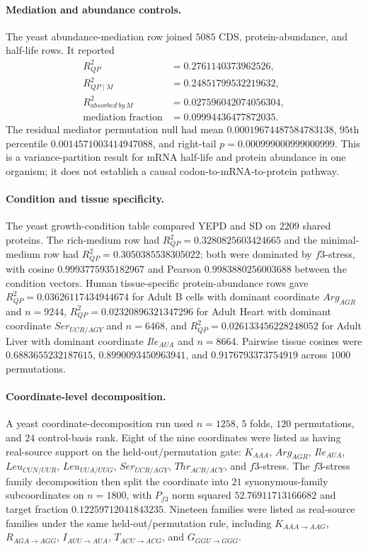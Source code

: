\paragraph{Mediation and abundance controls.}
The yeast abundance-mediation row joined $5085$ CDS, protein-abundance, and half-life rows.  It reported
$$
\begin{aligned}
R^2_{QP} &= 0.2761140373962526,\\
R^2_{QP\mid M} &= 0.24851799532219632,\\
R^2_{absorbed\ by\ M} &= 0.027596042074056304,\\
\text{mediation fraction} &= 0.09994436477872035.
\end{aligned}
$$
The residual mediator permutation null had mean $0.00019674487584783138$, $95$th percentile $0.0014571003414947088$, and right-tail $p=0.000999000999000999$.  This is a variance-partition result for mRNA half-life and protein abundance in one organism; it does not establish a causal codon-to-mRNA-to-protein pathway.

\paragraph{Condition and tissue specificity.}
The yeast growth-condition table compared YEPD and SD on $2209$ shared proteins.  The rich-medium row had $R^2_{QP}=0.3280825603424665$ and the minimal-medium row had $R^2_{QP}=0.3050385538305022$; both were dominated by $f3$-stress, with cosine $0.9993775935182967$ and Pearson $0.9983880256003688$ between the condition vectors.  Human tissue-specific protein-abundance rows gave $R^2_{QP}=0.03626117434944674$ for Adult B cells with dominant coordinate $Arg_{AGR}$ and $n=9244$, $R^2_{QP}=0.02320896321347296$ for Adult Heart with dominant coordinate $Ser_{UCR/AGY}$ and $n=6468$, and $R^2_{QP}=0.026133456228248052$ for Adult Liver with dominant coordinate $Ile_{AUA}$ and $n=8664$.  Pairwise tissue cosines were $0.6883655232187615$, $0.8990093450963941$, and $0.9176793373754919$ across $1000$ permutations.

\paragraph{Coordinate-level decomposition.}
A yeast coordinate-decomposition run used $n=1258$, $5$ folds, $120$ permutations, and $24$ control-basis rank.  Eight of the nine coordinates were listed as having real-source support on the held-out/permutation gate: $K_{AAA}$, $Arg_{AGR}$, $Ile_{AUA}$, $Leu_{CUN/UUR}$, $Leu_{UUA/UUG}$, $Ser_{UCR/AGY}$, $Thr_{ACR/ACY}$, and $f3$-stress.  The $f3$-stress family decomposition then split the coordinate into $21$ synonymous-family subcoordinates on $n=1800$, with $P_{f3}$ norm squared $52.76911713166682$ and target fraction $0.12259712041843235$.  Nineteen families were listed as real-source families under the same held-out/permutation rule, including $K_{AAA\to AAG}$, $R_{AGA\to AGG}$, $I_{AUU\to AUA}$, $T_{ACU\to ACG}$, and $G_{GGU\to GGG}$.

